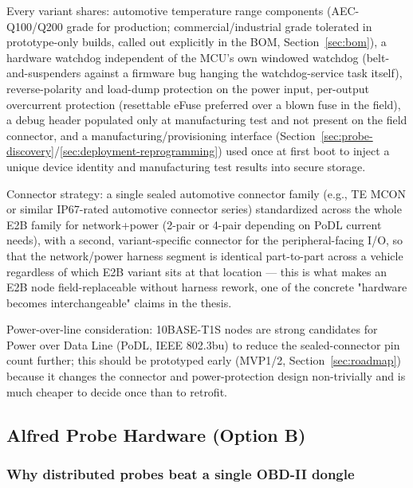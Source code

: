 Every variant shares: automotive temperature range components (AEC-Q100/Q200 grade for production; commercial/industrial grade tolerated in prototype-only builds, called out explicitly in the BOM, Section~\ref{sec:bom}), a hardware watchdog independent of the MCU's own windowed watchdog (belt-and-suspenders against a firmware bug hanging the watchdog-service task itself), reverse-polarity and load-dump protection on the power input, per-output overcurrent protection (resettable eFuse preferred over a blown fuse in the field), a debug header populated only at manufacturing test and not present on the field connector, and a manufacturing/provisioning interface (Section~\ref{sec:probe-discovery}/\ref{sec:deployment-reprogramming}) used once at first boot to inject a unique device identity and manufacturing test results into secure storage.

Connector strategy: a single sealed automotive connector family (e.g., TE MCON or similar IP67-rated automotive connector series) standardized across the whole E2B family for network+power (2-pair or 4-pair depending on PoDL current needs), with a second, variant-specific connector for the peripheral-facing I/O, so that the network/power harness segment is identical part-to-part across a vehicle regardless of which E2B variant sits at that location --- this is what makes an E2B node field-replaceable without harness rework, one of the concrete "hardware becomes interchangeable" claims in the thesis.

Power-over-line consideration: 10BASE-T1S nodes are strong candidates for Power over Data Line (PoDL, IEEE 802.3bu) to reduce the sealed-connector pin count further; this should be prototyped early (MVP1/2, Section~\ref{sec:roadmap}) because it changes the connector and power-protection design non-trivially and is much cheaper to decide once than to retrofit.

\subsection{Alfred Probe Hardware (Option B)}
\label{sec:probe-hardware}

\subsubsection{Why distributed probes beat a single OBD-II dongle}

